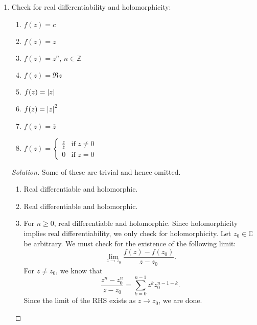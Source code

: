 \documentclass[11pt]{article}
\theoremstyle{definition}
\newenvironment{blockquote}
{\begin{mdframed}[skipabove=0pt, skipbelow=0pt, innertopmargin=4pt, innerbottommargin=4pt, bottomline=false,topline=false,rightline=false, linewidth=2pt]}
{\end{mdframed}}
\newenvironment{soln}{\begin{proof}[Solution]}{\end{proof}}
\begin{document}
\begin{enumerate}[leftmargin=*]
\begin{soln}
\begin{blockquote}
		\end{blockquote}
		
		Since $[0,1]$ is uncountable (we assume this without proof), and the images are disjoint (by claim (c)), we have that the set $\left\{ \sigma_{\lambda} \mid \lambda \in [0,1] \right\}$ is uncountable. Since the set $S$ is only countable, there exists some $\lambda_0 \in [0,1]$ such that $\sigma_{\lambda_0}(t) \notin S$ for all $t \in [0,1]$. In other words, $\sigma_{\lambda_0}$ is a path in $\mathbb{C} \setminus S$ starting at $z_1$ and ending at $z_2$. Since $z_1,z_2$ were arbitrary, we are done.
        
    \end{soln}
    
    \item Check for real differentiability and holomorphicity:
    
    \begin{enumerate}
        \item $f(z) = c$
        \item $f(z) = z$
        \item $f(z) = z^n$, $n \in \mathbb{Z}$
        \item $f(z) = \mathfrak{R}z$
        \item $f(z) = \abs{z}$
        \item $f(z) = \abs{z}^2$
        \item $f(z) = \overline{z}$
        \item $f(z) = \begin{cases}
            \frac{z}{\overline{z}} & \text{if } z \neq 0 \\
            0 & \text{if } z = 0
        \end{cases}$
    \end{enumerate}
    \begin{soln} Some of these are trivial and hence omitted.
    \begin{enumerate}
        \item Real differentiable and holomorphic.
        \item Real differentiable and holomorphic.
        \item For $n \geq 0$, real differentiable and holomorphic. Since holomorphicity implies real differentiability, we only check for holomorphicity. Let $z_0 \in \mathbb{C}$ be arbitrary.  We must check for the existence of the following limit:
        \[
            \lim_{z \to z_0} \frac{f(z) - f(z_0)}{z-z_0}.
        \]
        For $z \neq z_0$, we know that
        \[
            \frac{z^n - z_0^n}{z-z_0} = \sum_{k=0}^{n-1} z^k z_0^{n-1-k}.
        \]
        Since the limit of the RHS exists as $z \to z_0$, we are done.
        

\end{enumerate}
\end{soln}
\end{enumerate}
\end{document}
